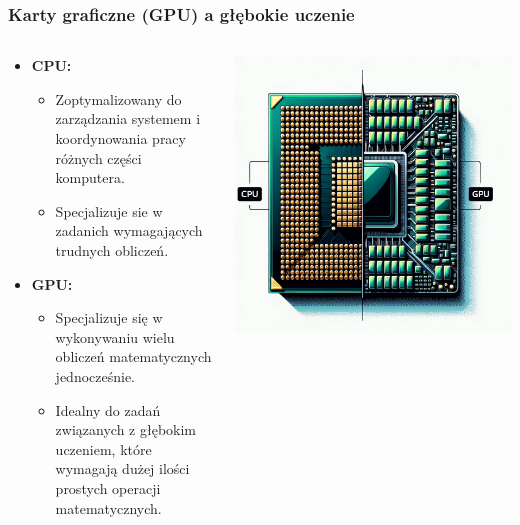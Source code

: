 \documentclass[smaller]{beamer}
\begin{document}

\begin{frame}
\frametitle{Karty graficzne (GPU) a głębokie uczenie}

\begin{columns}
    \begin{column}{0.6\textwidth}
        \begin{itemize}
            \item \textbf{CPU:}
                \begin{itemize}
                    \item Zoptymalizowany do zarządzania systemem i koordynowania pracy różnych części komputera.
                    \item Specjalizuje sie w zadanich wymagających trudnych obliczeń.
                \end{itemize}
            \item \textbf{GPU:}
                \begin{itemize}
                    \item Specjalizuje się w wykonywaniu wielu obliczeń matematycznych jednocześnie.
                    \item Idealny do zadań związanych z głębokim uczeniem, które wymagają dużej ilości prostych operacji matematycznych.
                \end{itemize}
        \end{itemize}
    \end{column}

    \begin{column}{0.4\textwidth}
        \includegraphics[width=\textwidth]{../manifest/cpu-gpu.png}
    \end{column}
\end{columns}
\end{frame}
\end{document}
